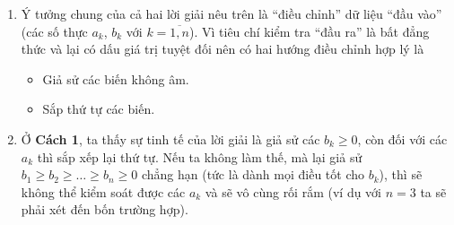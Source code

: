 \begin{bt}
{\begin{nx}
\begin{enumerate}
				\item Ý tưởng chung của cả hai lời giải nêu trên là ``điều chỉnh'' dữ liệu ``đầu vào'' (các số thực $a_k$, $b_k$ với $k=\overline{1,n}$). Vì tiêu chí kiểm tra ``đầu ra'' là bất đẳng thức và lại có dấu giá trị tuyệt đối nên có hai hướng điều chỉnh hợp lý là
				\begin{itemize}
					\item Giả sử các biến không âm.
					\item Sắp thứ tự các biến.
				\end{itemize}
				\item Ở \textbf{Cách 1}, ta thấy sự tinh tế của lời giải là giả sử các $b_k\ge0$, còn đối với các $a_k$ thì sắp xếp lại thứ tự. Nếu ta không làm thế, mà lại giả sử $b_1\ge b_2\ge\ldots\ge b_n\ge0$ chẳng hạn (tức là dành mọi điều tốt cho $b_k$), thì sẽ không thể kiểm soát được các $a_k$ và sẽ vô cùng rối rắm (ví dụ với $n=3$ ta sẽ phải xét đến bốn trường hợp).
			\end{enumerate}
		\end{nx}
	}
\end{bt}
